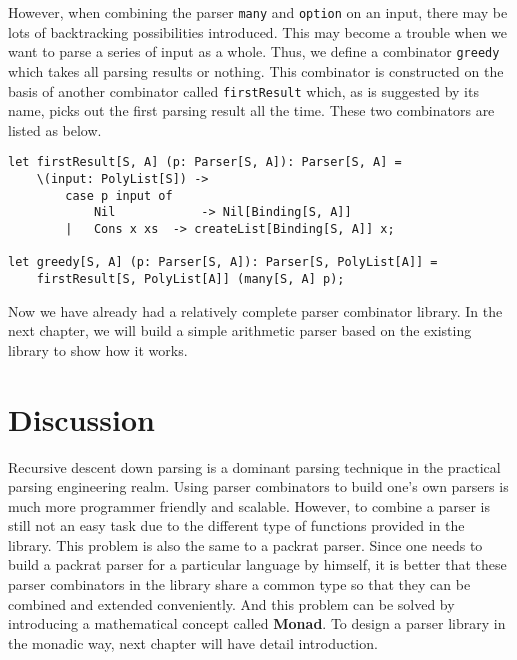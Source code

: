 However, when combining the parser \texttt{many} and \texttt{option} on an input, there may be lots of backtracking possibilities introduced. This may become a trouble when we want to parse a series of input as a whole. Thus, we define a combinator \texttt{greedy} which takes all parsing results or nothing. This combinator is constructed on the basis of another combinator called \texttt{firstResult} which, as is suggested by its name, picks out the first parsing result all the time. These two combinators are listed as below.
\begin{lstlisting}
let firstResult[S, A] (p: Parser[S, A]): Parser[S, A] =
    \(input: PolyList[S]) ->
        case p input of
            Nil            -> Nil[Binding[S, A]]
        |   Cons x xs  -> createList[Binding[S, A]] x;

let greedy[S, A] (p: Parser[S, A]): Parser[S, PolyList[A]] =
    firstResult[S, PolyList[A]] (many[S, A] p);
\end{lstlisting}
Now we have already had a relatively complete parser combinator library. In the next chapter, we will build a simple arithmetic parser based on the existing library to show how it works.

\section{Discussion}
Recursive descent down parsing is a dominant parsing technique in the practical parsing engineering realm. Using parser combinators to build one's own parsers is much more programmer friendly and scalable. However, to combine a parser is still not an easy task due to the different type of functions provided in the library. This problem is also the same to a packrat parser. Since one needs to build a packrat parser for a particular language by himself, it is better that these parser combinators in the library share a common type so that they can be combined and extended conveniently. And this problem can be solved by introducing a mathematical concept called \textbf{Monad}. To design a parser library in the monadic way, next chapter will have detail introduction.
